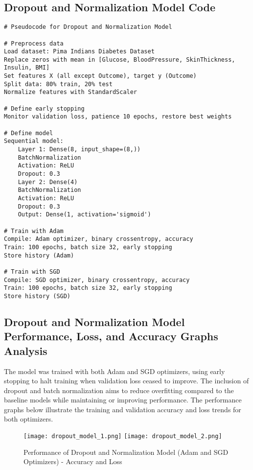 \documentclass[a4paper,12pt]{article}
\begin{document}
\subsection*{Dropout and Normalization Model Code}
\begin{verbatim}
# Pseudocode for Dropout and Normalization Model

# Preprocess data
Load dataset: Pima Indians Diabetes Dataset
Replace zeros with mean in [Glucose, BloodPressure, SkinThickness, Insulin, BMI]
Set features X (all except Outcome), target y (Outcome)
Split data: 80% train, 20% test
Normalize features with StandardScaler

# Define early stopping
Monitor validation loss, patience 10 epochs, restore best weights

# Define model
Sequential model:
    Layer 1: Dense(8, input_shape=(8,))
    BatchNormalization
    Activation: ReLU
    Dropout: 0.3
    Layer 2: Dense(4)
    BatchNormalization
    Activation: ReLU
    Dropout: 0.3
    Output: Dense(1, activation='sigmoid')

# Train with Adam
Compile: Adam optimizer, binary crossentropy, accuracy
Train: 100 epochs, batch size 32, early stopping
Store history (Adam)

# Train with SGD
Compile: SGD optimizer, binary crossentropy, accuracy
Train: 100 epochs, batch size 32, early stopping
Store history (SGD)
\end{verbatim}

\subsection*{Dropout and Normalization Model Performance, Loss, and Accuracy Graphs Analysis}
The model was trained with both Adam and SGD optimizers, using early stopping to halt training when validation loss ceased to improve. The inclusion of dropout and batch normalization aims to reduce overfitting compared to the baseline models while maintaining or improving performance. The performance graphs below illustrate the training and validation accuracy and loss trends for both optimizers.

\begin{figure}[h]
    \centering
    \texttt{[image: dropout\_model\_1.png]}
    \texttt{[image: dropout\_model\_2.png]}
    \caption{Performance of Dropout and Normalization Model (Adam and SGD Optimizers) - Accuracy and Loss}
\end{figure}
\end{document}
